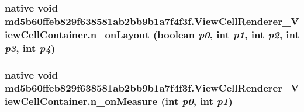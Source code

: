\hypertarget{classmd5b60ffeb829f638581ab2bb9b1a7f4f3f_1_1_view_cell_renderer___view_cell_container_925a68f0ccfb7b59829a006aba8ff5f6}{
\subsubsection[{n\_\-onLayout}]{\setlength{\rightskip}{0pt plus 5cm}native void md5b60ffeb829f638581ab2bb9b1a7f4f3f.ViewCellRenderer\_\-ViewCellContainer.n\_\-onLayout (boolean {\em p0}, \/  int {\em p1}, \/  int {\em p2}, \/  int {\em p3}, \/  int {\em p4})}}
\label{classmd5b60ffeb829f638581ab2bb9b1a7f4f3f_1_1_view_cell_renderer___view_cell_container_925a68f0ccfb7b59829a006aba8ff5f6}


\hypertarget{classmd5b60ffeb829f638581ab2bb9b1a7f4f3f_1_1_view_cell_renderer___view_cell_container_96ae769d8ff675310d41cbe5291e3424}{
\subsubsection[{n\_\-onMeasure}]{\setlength{\rightskip}{0pt plus 5cm}native void md5b60ffeb829f638581ab2bb9b1a7f4f3f.ViewCellRenderer\_\-ViewCellContainer.n\_\-onMeasure (int {\em p0}, \/  int {\em p1})}}
\label{classmd5b60ffeb829f638581ab2bb9b1a7f4f3f_1_1_view_cell_renderer___view_cell_container_96ae769d8ff675310d41cbe5291e3424}


